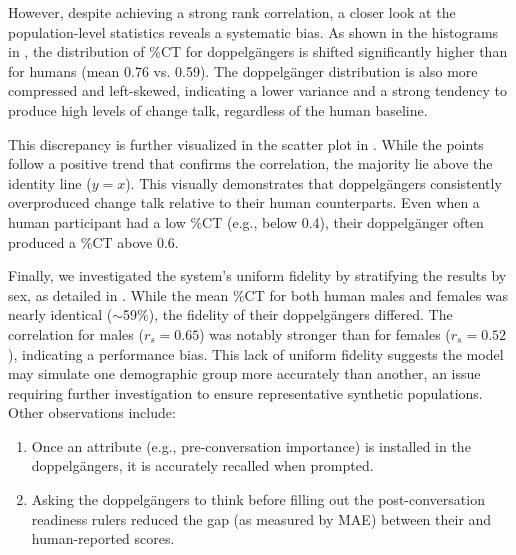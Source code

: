 However, despite achieving a strong rank correlation, a closer look at the population-level statistics reveals a systematic bias. As shown in the histograms in , the distribution of \%CT for doppelgängers is shifted significantly higher than for humans (mean 0.76 vs. 0.59). The doppelgänger distribution is also more compressed and left-skewed, indicating a lower variance and a strong tendency to produce high levels of change talk, regardless of the human baseline.

This discrepancy is further visualized in the scatter plot in . While the points follow a positive trend that confirms the correlation, the majority lie above the identity line ($y=x$). This visually demonstrates that doppelgängers consistently overproduced change talk relative to their human counterparts. Even when a human participant had a low \%CT (e.g., below 0.4), their doppelgänger often produced a \%CT above 0.6.

Finally, we investigated the system's uniform fidelity by stratifying the results by sex, as detailed in . While the mean \%CT for both human males and females was nearly identical ($\sim$59\%), the fidelity of their doppelgängers differed. The correlation for males ($r_s = 0.65$) was notably stronger than for females ($r_s = 0.52$), indicating a performance bias. This lack of uniform fidelity suggests the model may simulate one demographic group more accurately than another, an issue requiring further investigation to ensure representative synthetic populations. Other observations include:

\begin{enumerate}
    \item Once an attribute (e.g., pre-conversation importance) is installed in the doppelgängers, it is accurately recalled when prompted.
    \item Asking the doppelgängers to think before filling out the post-conversation readiness rulers reduced the gap (as measured by MAE) between their and human-reported scores.
\end{enumerate}



